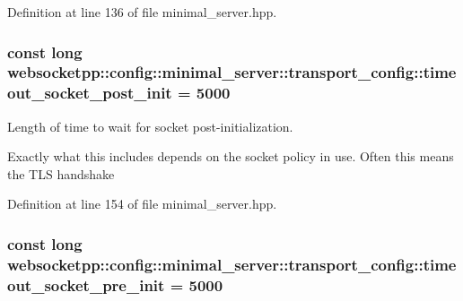 Definition at line 136 of file minimal\+\_\+server.\+hpp.

\subsubsection[{\texorpdfstring{timeout\+\_\+socket\+\_\+post\+\_\+init}{timeout\_socket\_post\_init}}]{\setlength{\rightskip}{0pt plus 5cm}const long websocketpp\+::config\+::minimal\+\_\+server\+::transport\+\_\+config\+::timeout\+\_\+socket\+\_\+post\+\_\+init = 5000\hspace{0.3cm}{\ttfamily [static]}}\hypertarget{structwebsocketpp_1_1config_1_1minimal__server_1_1transport__config_a8ff9307f4d8d33cd07c8d94afed18ca5}{}\label{structwebsocketpp_1_1config_1_1minimal__server_1_1transport__config_a8ff9307f4d8d33cd07c8d94afed18ca5}


Length of time to wait for socket post-\/initialization. 

Exactly what this includes depends on the socket policy in use. Often this means the T\+LS handshake 

Definition at line 154 of file minimal\+\_\+server.\+hpp.

\subsubsection[{\texorpdfstring{timeout\+\_\+socket\+\_\+pre\+\_\+init}{timeout\_socket\_pre\_init}}]{\setlength{\rightskip}{0pt plus 5cm}const long websocketpp\+::config\+::minimal\+\_\+server\+::transport\+\_\+config\+::timeout\+\_\+socket\+\_\+pre\+\_\+init = 5000\hspace{0.3cm}{\ttfamily [static]}}\hypertarget{structwebsocketpp_1_1config_1_1minimal__server_1_1transport__config_abe0f95c0e47d16ff3b316910fed6e5f1}{}\label{structwebsocketpp_1_1config_1_1minimal__server_1_1transport__config_abe0f95c0e47d16ff3b316910fed6e5f1}


